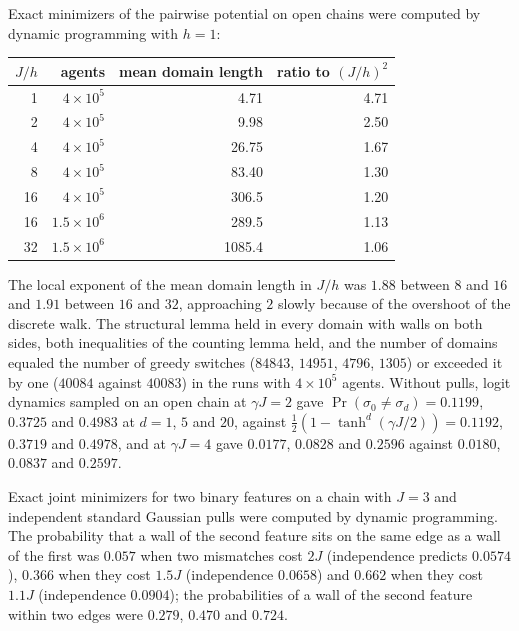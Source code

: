\begin{numcheck}\label{chk:coh-domains}
Exact minimizers of the pairwise potential on open chains were computed by dynamic programming with $h=1$:
\begin{center}
\begin{tabular}{@{}rrrr@{}}
\toprule
$J/h$ & agents & mean domain length & ratio to $(J/h)^2$ \\
\midrule
1 & $4\times10^5$ & 4.71 & 4.71 \\
2 & $4\times10^5$ & 9.98 & 2.50 \\
4 & $4\times10^5$ & 26.75 & 1.67 \\
8 & $4\times10^5$ & 83.40 & 1.30 \\
16 & $4\times10^5$ & 306.5 & 1.20 \\
16 & $1.5\times10^6$ & 289.5 & 1.13 \\
32 & $1.5\times10^6$ & 1085.4 & 1.06 \\
\bottomrule
\end{tabular}
\end{center}
The local exponent of the mean domain length in $J/h$ was $1.88$ between $8$ and $16$ and $1.91$ between $16$ and $32$, approaching $2$ slowly because of the overshoot of the discrete walk. The structural lemma held in every domain with walls on both sides, both inequalities of the counting lemma held, and the number of domains equaled the number of greedy switches ($84843$, $14951$, $4796$, $1305$) or exceeded it by one ($40084$ against $40083$) in the runs with $4\times10^5$ agents. Without pulls, logit dynamics sampled on an open chain at $\gamma J=2$ gave $\Pr(\sigma_0\ne\sigma_d)=0.1199$, $0.3725$ and $0.4983$ at $d=1$, $5$ and $20$, against $\frac12(1-\tanh^d(\gamma J/2))=0.1192$, $0.3719$ and $0.4978$, and at $\gamma J=4$ gave $0.0177$, $0.0828$ and $0.2596$ against $0.0180$, $0.0837$ and $0.2597$.
\end{numcheck}

\begin{numcheck}\label{chk:coh-bundling}
Exact joint minimizers for two binary features on a chain with $J=3$ and independent standard Gaussian pulls were computed by dynamic programming. The probability that a wall of the second feature sits on the same edge as a wall of the first was $0.057$ when two mismatches cost $2J$ (independence predicts $0.0574$), $0.366$ when they cost $1.5J$ (independence $0.0658$) and $0.662$ when they cost $1.1J$ (independence $0.0904$); the probabilities of a wall of the second feature within two edges were $0.279$, $0.470$ and $0.724$.
\end{numcheck}

